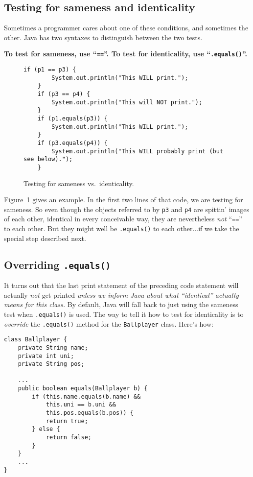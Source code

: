 \subsection{Testing for sameness and identicality}

Sometimes a programmer cares about one of these conditions, and sometimes the
other. Java has two syntaxes to distinguish between the two tests.

\textbf{To test for sameness, use ``\texttt{==}''. To test for identicality, use
``\texttt{.equals()}''.}

\begin{figure}
\begin{Verbatim}[fontsize=\scriptsize,samepage=true,frame=single]
    if (p1 == p3) {
        System.out.println("This WILL print.");
    }
    if (p3 == p4) {
        System.out.println("This will NOT print.");
    }
    if (p1.equals(p3)) {
        System.out.println("This WILL print.");
    }
    if (p3.equals(p4)) {
        System.out.println("This WILL probably print (but see below).");
    }
\end{Verbatim}
\caption{Testing for sameness vs.~identicality.}
\label{fig:sameness}
\end{figure}

Figure~\ref{fig:sameness} gives an example. In the first two lines of that
code, we are testing for sameness. So even though the objects referred to by
\texttt{p3} and \texttt{p4} are spittin' images of each other, identical in
every conceivable way, they are nevertheless \textit{not} ``\texttt{==}'' to
each other. But they might well be \texttt{.equals()} to each other...if we
take the special step described next.

\subsection{Overriding \texttt{.equals()}}

It turns out that the last print statement of the preceding code statement
will actually \textit{not} get printed \textit{unless we inform Java about
what ``identical'' actually means for this class.} By default, Java will fall
back to just using the sameness test when \texttt{.equals()} is used. The way
to tell it how to test for identicality is to \textit{override} the
\texttt{.equals()} method for the \texttt{Ballplayer} class. Here's how:

\begin{Verbatim}[fontsize=\footnotesize,samepage=true,frame=single]
class Ballplayer {
    private String name;
    private int uni;
    private String pos;
    
    ...
    public boolean equals(Ballplayer b) {
        if (this.name.equals(b.name) &&
            this.uni == b.uni &&
            this.pos.equals(b.pos)) {
            return true;
        } else {
            return false;
        }
    }
    ...
}
\end{Verbatim}

